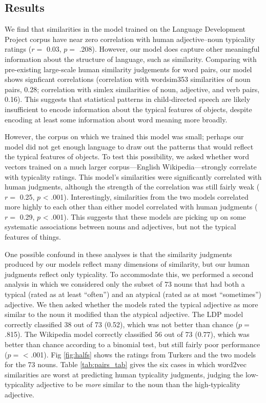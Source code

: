 \documentclass[10pt, letterpaper]{article}
\begin{document}
\hypertarget{results-1}{%
\subsection{Results}\label{results-1}}

We find that similarities in the model trained on the Language
Development Project corpus have near zero correlation with human
adjective--noun typicality ratings (\(r =\) 0.03, \(p =\) .208).
However, our model does capture other meaningful information about the
structure of language, such as similarity. Comparing with pre-existing
large-scale human similarity judgements for word pairs, our model shows
signficant correlations (correlation with wordsim353 similarities of
noun pairs, 0.28; correlation with simlex similarities of noun,
adjective, and verb pairs, 0.16). This suggests that statistical
patterns in child-directed speech are likely insufficient to encode
information about the typical features of objects, despite encoding at
least some information about word meaning more broadly.

However, the corpus on which we trained this model was small; perhaps
our model did not get enough language to draw out the patterns that
would reflect the typical features of objects. To test this possibility,
we asked whether word vectors trained on a much larger corpus---English
Wikipedia---strongly correlate with typicality ratings. This model's
similarities were significantly correlated with human judgments,
although the strength of the correlation was still fairly weak (\(r =\)
0.25, \(p\) \textless{} .001). Interestingly, similarities from the two
models correlated more highly to each other than either model correlated
with human judgments (\(r =\) 0.29, \(p\) \textless{} .001). This
suggests that these models are picking up on some systematic
associations between nouns and adjectives, but not the typical features
of things.

One possible confound in these analyses is that the similarity judgments
produced by our models reflect many dimensions of similarity, but our
human judgments reflect only typicality. To accommodate this, we
performed a second analysis in which we considered only the subset of 73
nouns that had both a typical (rated as at least ``often'') and an
atypical (rated as at most ``sometimes'') adjective. We then asked
whether the models rated the typical adjective as more similar to the
noun it modified than the atypical adjective. The LDP model correctly
classified 38 out of 73 (0.52), which was not better than chance
(\(p =\) .815). The Wikipedia model correctly classified 56 out of 73
(0.77), which was better than chance according to a binomial test, but
still fairly poor performance (\(p =\) \textless{} .001). Fig
\ref{fig:halfs} shows the ratings from Turkers and the two models for
the 73 nouns. Table \ref{tab:pairs_tab} gives the six cases in which
word2vec similarities are worst at predicting human typicality
judgments, judging the low-typicality adjective to be \emph{more}
similar to the noun than the high-typicality adjective.
\end{document}
